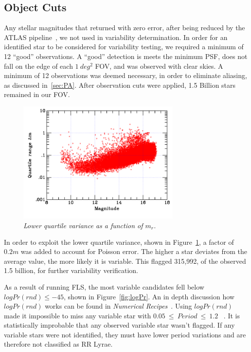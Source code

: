 \documentclass[aps,prb,twocolumn,superscriptaddress]{revtex4-1}
\begin{document}
\subsection{Object Cuts}\label{sec:cuts}

Any stellar magnitudes that returned with zero error, after being reduced by the ATLAS pipeline~\cite{gri}, we not used in variability determination.  
In order for an identified star to be considered for 
variability testing, we required a minimum of 12 ``good'' observations.  A ``good'' detection is meets the minimum 
PSF, does not fall on the edge of each $1~deg^{2}$ FOV, and was observed with clear skies.  A minimum of 12 
observations was deemed necessary, in order to eliminate aliasing, as discussed in~\cref{sec:PA}.  After observation 
cuts were applied, 1.5 Billion stars remained in our FOV.  


\begin{figure}[H]
 \centering
 	\includegraphics[width=3.2in]{figures/grpvar.png}
 \caption{\it \small{Lower quartile variance as a function of $m_{r}$.}}
 \label{fig:quart}
\end{figure}
  In order to exploit the lower quartile variance, shown in Figure~\ref{fig:quart}, a factor of $0.2m$ was added to account for Poisson error.  
The higher a star deviates from the average value, the more likely it is variable.  This flagged 315,992, of the observed 1.5 billion, for 
further variability verification.


As a result of running FLS, the most variable candidates fell below $logPr(rnd)\leq-45$, shown in Figure~\ref{fig:logPr}.
An in depth discussion how $logPr(rnd)$ works can be found in \textit{Numerical Recipes}~\cite{logPr, Numerical}.  Using $logPr(rnd)$ made it impossible 
to miss any variable star with $0.05~\leq~Period~\leq~1.2$ ~\cite{AAVSO}.  It is statistically improbable that any observed variable star wasn't flagged.  If any variable stars were not identified, they must have lower period variations and are therefore not classified as RR Lyrae.
\end{document}
